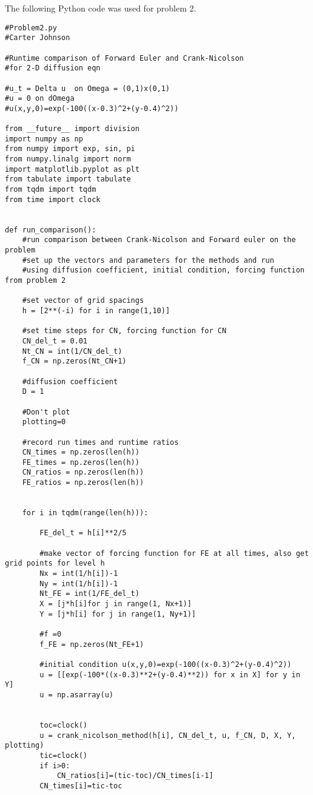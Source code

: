\documentclass[12pt]{article}
\begin{document}
\newpage
The following Python code was used for problem 2.
\begin{verbatim}
#Problem2.py
#Carter Johnson

#Runtime comparison of Forward Euler and Crank-Nicolson
#for 2-D diffusion eqn

#u_t = Delta u  on Omega = (0,1)x(0,1)
#u = 0 on dOmega
#u(x,y,0)=exp(-100((x-0.3)^2+(y-0.4)^2))

from __future__ import division
import numpy as np
from numpy import exp, sin, pi
from numpy.linalg import norm
import matplotlib.pyplot as plt
from tabulate import tabulate
from tqdm import tqdm
from time import clock


def run_comparison():
    #run comparison between Crank-Nicolson and Forward euler on the problem
    #set up the vectors and parameters for the methods and run
    #using diffusion coefficient, initial condition, forcing function from problem 2

    #set vector of grid spacings
    h = [2**(-i) for i in range(1,10)]

    #set time steps for CN, forcing function for CN
    CN_del_t = 0.01
    Nt_CN = int(1/CN_del_t)
    f_CN = np.zeros(Nt_CN+1)

    #diffusion coefficient
    D = 1

    #Don't plot
    plotting=0

    #record run times and runtime ratios
    CN_times = np.zeros(len(h))
    FE_times = np.zeros(len(h))
    CN_ratios = np.zeros(len(h))
    FE_ratios = np.zeros(len(h))

    
    for i in tqdm(range(len(h))):

        FE_del_t = h[i]**2/5

        #make vector of forcing function for FE at all times, also get grid points for level h
        Nx = int(1/h[i])-1
        Ny = int(1/h[i])-1
        Nt_FE = int(1/FE_del_t)
        X = [j*h[i]for j in range(1, Nx+1)]
        Y = [j*h[i] for j in range(1, Ny+1)]
        
        #f =0
        f_FE = np.zeros(Nt_FE+1)
    
        #initial condition u(x,y,0)=exp(-100((x-0.3)^2+(y-0.4)^2))
        u = [[exp(-100*((x-0.3)**2+(y-0.4)**2)) for x in X] for y in Y]
        u = np.asarray(u)


        toc=clock()
        u = crank_nicolson_method(h[i], CN_del_t, u, f_CN, D, X, Y, plotting)
        tic=clock()
        if i>0:
            CN_ratios[i]=(tic-toc)/CN_times[i-1]
        CN_times[i]=tic-toc


\end{verbatim}
\end{document}

